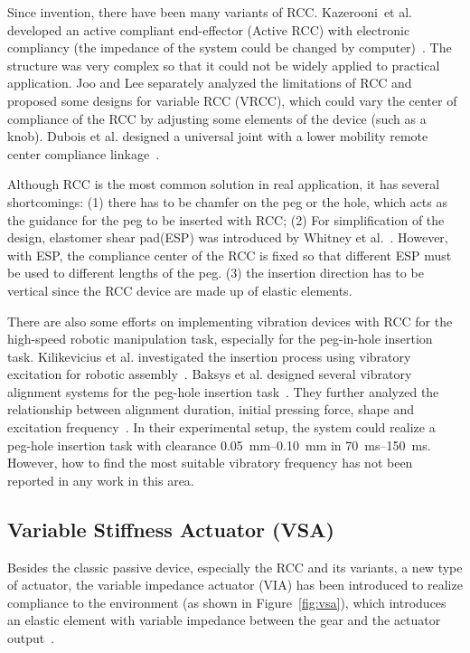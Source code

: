 \documentclass[journal,twoside,web]{ieeecolor}
\begin{document}
Since invention, there have been many variants of RCC. 
Kazerooni~et al. developed an active compliant end-effector (Active RCC) with electronic compliancy (the impedance of the system could be changed by computer)~\cite{Kazerooni1988}. The structure was very complex so that it could not be widely applied to practical application.
Joo and Lee separately analyzed the limitations of RCC and proposed some designs for variable RCC (VRCC)\cite{Joo1998, Lee2005}, which could vary the center of compliance of the RCC by adjusting some elements of the device (such as a knob).
Dubois et al. designed a universal joint with a lower mobility remote center compliance linkage~\cite{Dubois2016}.

Although RCC is the most common solution in real application, it has several shortcomings: (1) there has to be chamfer on the peg or the hole, which acts as the guidance for the peg to be inserted with RCC; (2) For simplification of the design, elastomer shear pad(ESP) was introduced by Whitney et al.~\cite{Whitney1986b}. However, with ESP, the compliance center of the RCC is fixed so that different ESP must be used to different lengths of the peg. (3) the insertion direction has to be vertical since the RCC device are made up of elastic elements.

There are also some efforts on implementing vibration devices with RCC for the high-speed robotic manipulation task, especially for the peg-in-hole insertion task. 
Kilikevicius et al. investigated the insertion process using vibratory excitation for robotic assembly~\cite{Kilikevicius2007,Kilikevicius2011}. 
Baksys et al. designed several vibratory alignment systems for the peg-hole insertion task~\cite{Baksys2008,Baksys2011}. They further analyzed the relationship between alignment duration, initial pressing force, shape and excitation frequency~\cite{Baksys2010}. 
In their experimental setup, the system could realize a peg-hole insertion task with clearance \SIrange{0.05}{0.10}{\milli\meter} in \SIrange{70}{150}{\milli\second}.
However, how to find the most suitable vibratory frequency has not been reported in any work in this area.

\subsection{Variable Stiffness Actuator (VSA)}
\label{subsec:vsa}

Besides the classic passive device, especially the RCC and its variants, a new type of actuator, the variable impedance actuator (VIA) has been introduced to realize compliance to the environment (as shown in Figure~\ref{fig:vsa}), which introduces an elastic element with variable impedance between the gear and the actuator output~\cite{Wolf2016}.
\end{document}
